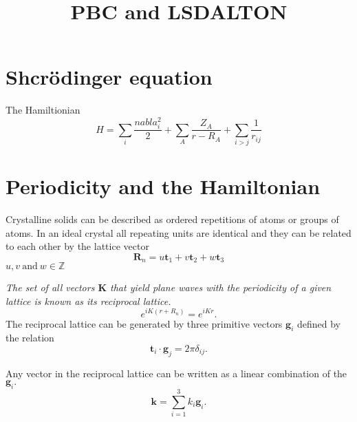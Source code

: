 \documentclass[12pt,a4paper,english]{beamer}
\title{PBC and LSDALTON}
\newcommand{\mbf}{ \mathbf }
\begin{document}
\date{}
\frame{\titlepage}

\section{Shcr\"odinger equation}
\begin{frame}
  The Hamiltionian
  \begin{equation}
	H= \sum_i \frac{nabla^2_i}{2} + \sum_{A}\frac{Z_A}{r-R_A}+\sum_{i>j}\frac{1}{r_{ij}}
	\label{eq:ham}
  \end{equation}

\end{frame}

\section{Periodicity and the Hamiltonian}

\begin{frame}
 Crystalline solids can be described as ordered repetitions of atoms or groups
 of atoms. In an ideal crystal all repeating units are 
 identical and they can be related to each other by the lattice vector
 \begin{equation*}
   \mbf R_n= u\mbf t_1 + v\mbf t_2 + w\mbf t_3
 \end{equation*}
 $u,v~\mbox{and}~w\in \mathbb{Z}$
\end{frame}

\begin{frame}
  \emph{The set of all vectors $\mbf{K}$ that yield plane waves with the periodicity of a given lattice is known as its reciprocal lattice.}
  $$e^{iK(r+R_n)}=e^{iKr}.$$
  The reciprocal lattice can be generated by three primitive vectors $\mbf g_i$
  defined by the relation 
  $$\mbf t_i\cdot \mbf g_j=2\pi\delta_{ij}.$$

  Any vector in the reciprocal lattice can be written as a linear combination of  the $\mbf g_i.$
  $$\mbf k= \sum_{i=1}^3 k_i\mbf g_i.$$

\end{frame}

\end{document}

